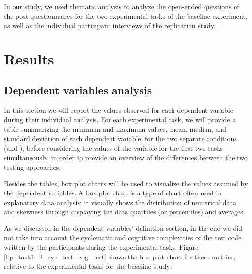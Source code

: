 In our study, we used thematic analysis to analyze the open-ended questions of the post-questionnaires for the two experimental tasks of the baseline experiment, as well as the individual participant interviews of the replication study.



\section{Results}
\subsection{Dependent variables analysis}
In this section we will report the values observed for each dependent variable during their individual analysis. For each experimental task, we will provide a table summarizing the minimum and maximum values, mean, median, and standard deviation of each dependent variable, for the two separate conditions (\ie \tdd and \notdd), before considering the values of the variable for the first two tasks simultaneously, in order to provide an overview of the differences between the two testing approaches.

Besides the tables, box plot charts will be used to visualize the values assumed by the dependent variables.
A box plot chart is a type of chart often used in explanatory data analysis; it visually shows the distribution of numerical data and skewness through displaying the data quartiles (or percentiles) and averages.


As we discussed in the dependent variables' definition section, in the end we did not take into account the cyclomatic and cognitive complexities of the test code written by the participants during the experimental tasks. 
Figure \ref{bp_task1_2_cyc_test_cog_test} shows the box plot chart for these metrics, relative to the experimental tasks for the baseline study:

